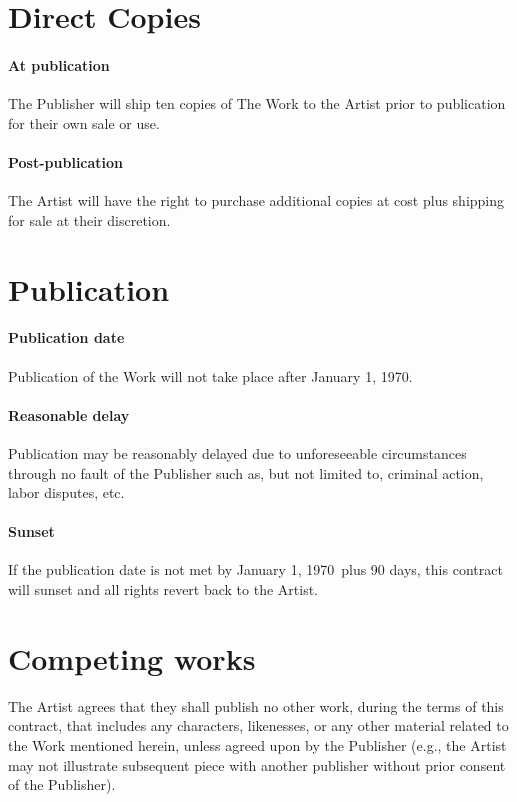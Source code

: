 \documentclass[12pt,letterpaper]{article}
\def\PublicationDate{January 1, 1970}
\begin{document}
\section{Direct Copies}

\paragraph{At publication} The Publisher will ship ten copies of The Work to the Artist prior to publication for their own sale or use.

\paragraph{Post-publication} The Artist will have the right to purchase additional copies at cost plus shipping for sale at their discretion.

\section{Publication}

\paragraph{Publication date}

Publication of the Work will not take place after \PublicationDate.

\paragraph{Reasonable delay}

Publication may be reasonably delayed due to unforeseeable circumstances through no fault of the Publisher such as, but not limited to, criminal action, labor disputes, etc.

\paragraph{Sunset}

If the publication date is not met by \PublicationDate\ plus 90 days, this contract will sunset and all rights revert back to the Artist.

\section{Competing works}

The Artist agrees that they shall publish no other work, during the terms of this contract, that includes any characters, likenesses, or any other material related to the Work mentioned herein, unless agreed upon by the Publisher (e.g., the Artist may not illustrate subsequent piece with another publisher without prior consent of the Publisher).
\end{document}
